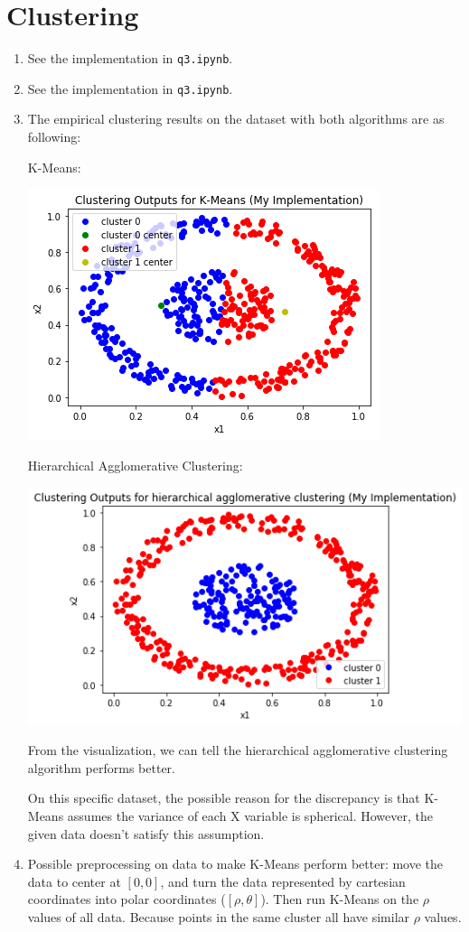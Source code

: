 \documentclass[paper=letter, fontsize=12pt]{article}
\begin{document}
\section{Clustering}
\begin{enumerate}[label=(\alph*)]
	\item See the implementation in \verb|q3.ipynb|.
	
	\item See the implementation in \verb|q3.ipynb|.
	
	\item The empirical clustering results on the dataset with both algorithms are as following:
	
	K-Means:
	
	\includegraphics[scale=0.6]{q3c1.png}
	
	Hierarchical Agglomerative Clustering:
	
	\includegraphics[scale=0.6]{q3c2.png}
	
	From the visualization, we can tell the hierarchical agglomerative clustering algorithm performs better. 
	
	On this specific dataset, the possible reason for the discrepancy is that K-Means assumes the variance of each X variable is spherical. However, the given data doesn't satisfy this assumption. 
	
	\item Possible preprocessing on data to make K-Means perform better: move the data to center at $[0, 0]$, and turn the data represented by cartesian coordinates into polar coordinates ($[\rho, \theta]$). Then run K-Means on the $\rho$ values of all data. Because points in the same cluster all have similar $\rho$ values. 
	
\end{enumerate}
\end{document}
